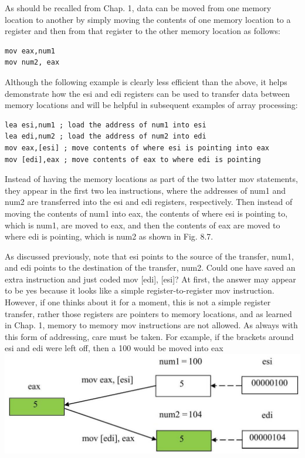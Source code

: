 \documentclass[10pt]{article}
\begin{document}
As should be recalled from Chap. 1, data can be moved from one memory location to another by simply moving the contents of one memory location to a register and then from that register to the other memory location as follows:

\begin{verbatim}
mov eax,num1
mov num2, eax
\end{verbatim}

Although the following example is clearly less efficient than the above, it helps demonstrate how the esi and edi registers can be used to transfer data between memory locations and will be helpful in subsequent examples of array processing:

\begin{verbatim}
lea esi,num1 ; load the address of num1 into esi
lea edi,num2 ; load the address of num2 into edi
mov eax,[esi] ; move contents of where esi is pointing into eax
mov [edi],eax ; move contents of eax to where edi is pointing
\end{verbatim}

Instead of having the memory locations as part of the two latter mov statements, they appear in the first two lea instructions, where the addresses of num1 and num2 are transferred into the esi and edi registers, respectively. Then instead of moving the contents of num1 into eax, the contents of where esi is pointing to, which is num1, are moved to eax, and then the contents of eax are moved to where edi is pointing, which is num2 as shown in Fig. 8.7.

As discussed previously, note that esi points to the source of the transfer, num1, and edi points to the destination of the transfer, num2. Could one have saved an extra instruction and just coded mov [edi], [esi]? At first, the answer may appear to be yes because it looks like a simple register-to-register mov instruction. However, if one thinks about it for a moment, this is not a simple register transfer, rather those registers are pointers to memory locations, and as learned in Chap. 1, memory to memory mov instructions are not allowed. As always with this form of addressing, care must be taken. For example, if the brackets around esi and edi were left off, then a 100 would be moved into eax\\
\includegraphics[max width=\textwidth, center]{2025_03_24_ebe50cc223a6fbc49eecg-183}
\end{document}
